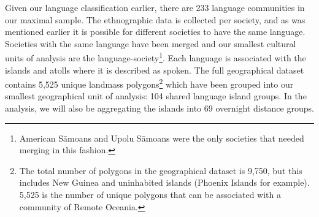 \documentclass[a4paper,10pt]{article} %
\begin{document}



Given our language classification earlier, there are 233 language communities in our maximal sample. The ethnographic data is collected per society, and as was mentioned earlier it is possible for different societies to have the same language. Societies with the same language have been merged and our smallest cultural units of analysis are the language-society\footnote{American S\={a}moans and Upolu S\={a}moans were the only societies that needed merging in this fashion.}. Each language is associated with the islands and atolls where it is described as spoken. The full geographical dataset contains 5,525 unique landmass polygons\footnote{The total number of polygons in the geographical dataset is 9,750, but this includes New Guinea and uninhabited islands (Phoenix Islands for example). 5,525 is the number of unique polygons that can be associated with a community of Remote Oceania.} which have been grouped into our smallest geographical unit of analysis: 104 shared language island groups. In the analysis, we will also be aggregating the islands into 69 overnight distance groups.
\end{document}
